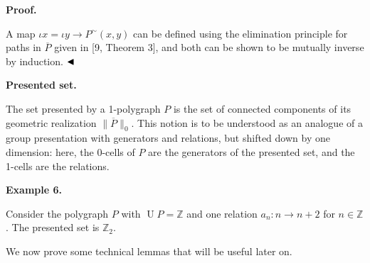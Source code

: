 \documentclass[10pt,a4paper]{amsart}
\begin{document}
 
\par\medskip\noindent\textbf{Proof.}\par
 
 
A map $\iota x=\iota y\to P^{\sim}(x,y)$ can be defined using the elimination principle for paths in $\overline{P}$ given in [9, Theorem 3], and both can be shown to be mutually inverse by induction. $\hfill\blacktriangleleft$\par
 
 
 
 
\par\medskip\noindent\textbf{Presented set.}\par
 
 
The set presented by a 1-polygraph $P$ is the set of connected components of its geometric realization $\|\overline{P}\|_{0}$. This notion is to be understood as an analogue of a group presentation with generators and relations, but shifted down by one dimension: here, the 0-cells of $P$ are the generators of the presented set, and the 1-cells are the relations.\par
 
 
 
\par\medskip\noindent\textbf{Example 6.}\par
 
 
Consider the polygraph $P$ with $\operatorname{U}P=\mathbb{Z}$ and one relation $a_{n}:n\to n+2$ for $n\in\mathbb{Z}$. The presented set is $\mathbb{Z}_{2}$.\par
 
 
 
 
We now prove some technical lemmas that will be useful later on.\par
 
 
 
\end{document}
